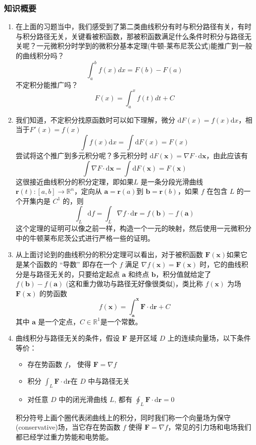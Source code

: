 \subsubsection{知识概要}
\begin{enumerate}
    \item  在上面的习题当中，我们感受到了第二类曲线积分有时与积分路径有关，有时与积分路径无关，关键看被积函数，那被积函数满足什么条件时积分与路径无关呢？一元微积分时学到的微积分基本定理(牛顿-莱布尼茨公式)能推广到一般的曲线积分吗？
    \[
        \int_a^bf(x)dx=F(b)-F(a)
    \]
    不定积分能推广吗？
    \[
        F(x)=\int_a^xf(t)dt+C
    \]

    \item 我们知道，不定积分找原函数时可以如下理解，微分 $\mathrm{d} F(x) = f(x) \mathrm{d}x$，相当于$F'(x) = f(x)$
    \[
        \int f(x) \mathrm{d} x = \int \mathrm{d} F(x) = F(x)
    \]
    尝试将这个推广到多元积分呢？多元积分时 $ \mathrm{d} F(\mathbf{x}) = \nabla F \cdot  \mathrm{d} \mathbf{x}$，由此应该有
    \[
        \int \nabla F \cdot  \mathrm{d} \mathbf{x} = \int \mathrm{d} F(\mathbf{x}) = F(\mathbf{x})
    \]
    这很接近曲线积分的积分定理，即如果$L$ 是一条分段光滑曲线 $\mathbf{r}(t): [a,b] \to \mathbb{R}^n $，定向从 $\mathbf{a} = \mathbf{r}(a)$到 $\mathbf{b} = \mathbf{r}(b)$，如果 $f$ 在包含 $L$ 的一个开集内是 $C^{1}$ 的，则
    \[
        \int_L \mathrm{d} f=\int_L\nabla f\cdot \mathrm{d}\mathbf{r}=f(\mathbf{b})-f(\mathbf{a})
    \]
    这个定理的证明可以像之前一样，构造一个一元的映射，然后使用一元微积分中的牛顿莱布尼茨公式进行严格一些的证明。

    \item 从上面讨论到的曲线积分的积分定理可以看出，对于被积函数 $\mathbf{F}(\mathbf{x})$如果它是某个函数的 “导数” 即存在一个 $f$ 满足 $\nabla f(\mathbf{x}) = \mathbf{F}(\mathbf{x})$ 时，它的曲线积分是与路径无关的，只要给定起点 $\mathbf{a}$ 和终点 $\mathbf{b}$，积分值就给定了 $f(\mathbf{b}) - f(\mathbf{a})$ (这和重力做功与路径无好像很类似)，类比称 $f(\mathbf{x})$ 为场 $\mathbf{F}(\mathbf{x})$ 的势函数
    \[
        f(\mathbf{x}) = \int _{\mathbf{a}}^\mathbf{x} \mathbf{F} \cdot \mathrm{d} \mathbf{r} + C
    \]
    其中 $\mathbf{a}$ 是一个定点，$C \in \mathbb{R}^1$是一个常数。

    \item 曲线积分与路径无关的条件，假设 $\mathbf{F}$ 是开区域 $D$ 上的连续向量场，以下条件等价：
    \begin{itemize}
    	\item 存在势函数 $f$， 使得 $\mathbf{F} = \nabla f$
            \item 积分 $\int _L \mathbf{F} \cdot \mathrm{d} \mathbf{r}$在 $D$ 中与路径无关
            \item 对任意 $D$ 中的闭光滑曲线 $L$, 都有 $\oint _L \mathbf{F} \cdot \mathrm{d} \mathbf{r} = 0 $
    \end{itemize}
    积分符号上画个圈代表闭曲线上的积分，同时我们称一个向量场为保守(conservative)场，当它存在势函数 $f$ 使得 $\mathbf{F} = \nabla f$，常见的引力场和电场我们都已经学过重力势能和电势能。


\end{enumerate}
